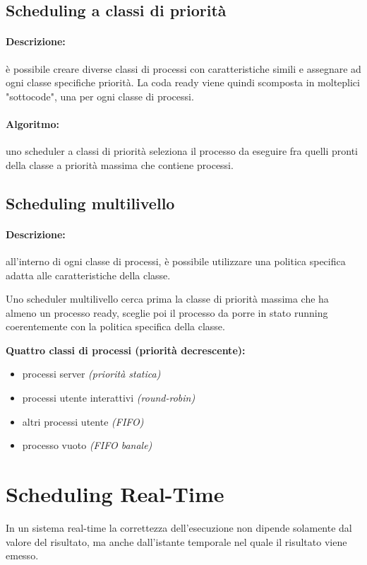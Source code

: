 \subsection{Scheduling a classi di priorità}

\paragraph{Descrizione:} è possibile creare diverse classi di processi con caratteristiche simili e assegnare ad ogni classe specifiche priorità. La coda ready viene quindi scomposta in molteplici "sottocode", una per ogni classe di processi.

\paragraph{Algoritmo:} uno scheduler a classi di priorità seleziona il processo da eseguire fra quelli pronti della classe a priorità massima che contiene processi.

\subsection{Scheduling multilivello}
\paragraph{Descrizione:} all'interno di ogni classe di processi, è possibile utilizzare una politica specifica adatta alle caratteristiche della classe. 

Uno scheduler multilivello cerca prima la classe di priorità massima che ha almeno un processo ready, sceglie poi il processo da porre in stato running coerentemente con la politica specifica della classe.
\newline

\textbf{Quattro classi di processi (priorità decrescente):}

\begin{itemize}
    \item processi server \textit{(priorità statica)}
    \item processi utente interattivi \textit{(round-robin)}
    \item altri processi utente \textit{(FIFO)}
    \item processo vuoto \textit{(FIFO banale)}
\end{itemize}

\section{Scheduling Real-Time}
In un sistema real-time la correttezza dell'esecuzione non dipende solamente dal valore del risultato, ma anche dall'istante temporale nel quale il risultato viene emesso.

